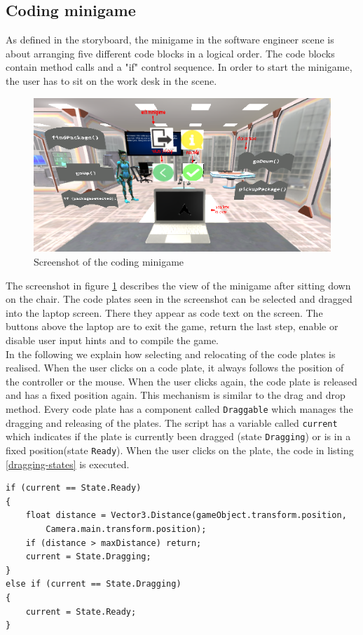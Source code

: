 \subsection{Coding minigame}
\label{minigame}
As defined in the storyboard, the minigame in the software engineer scene is about arranging five different code blocks in a logical order. The code blocks contain method calls and a "if" control sequence. In order to start the minigame, the user has to sit on the work desk in the scene.
\begin{figure}[h!]
  \includegraphics[width=16cm]{kapitel/se-minigame2.PNG}
  \centering
  \caption{Screenshot of the coding minigame}
  \label{fig:se-minigame}
\end{figure}

The screenshot in figure \ref{fig:se-minigame} describes the view of the minigame after sitting down on the chair. The code plates seen in the screenshot can be selected and dragged into the laptop screen. There they appear as code text on the screen. The buttons above the laptop are to exit the game, return the last step, enable or disable user input hints and to compile the game. \\
In the following we explain how selecting and relocating of the code plates is realised.
When the user clicks on a code plate, it always follows the position of the controller or the mouse. When the user clicks again, the code plate is released and has a fixed position again. This mechanism is similar to the drag and drop method. Every code plate has a component called \texttt{Draggable} which manages the dragging and releasing of the plates. The script has a variable called \texttt{current} which indicates if the plate is currently been dragged (state \texttt{Dragging}) or is in a fixed position(state \texttt{Ready}). When the user clicks on the plate, the code in listing \ref{dragging-states} is executed.
 \newpage
\begin{lstlisting} 
if (current == State.Ready)
{   
    float distance = Vector3.Distance(gameObject.transform.position,
        Camera.main.transform.position);
    if (distance > maxDistance) return;
    current = State.Dragging;
}
else if (current == State.Dragging)
{
    current = State.Ready;
}
\end{lstlisting}
\label{dragging-states}

